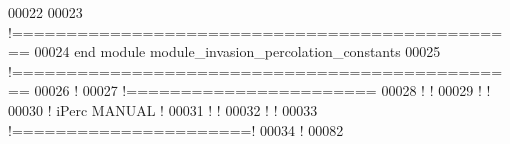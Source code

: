 \begin{DoxyCode}
00022 
00023 \textcolor{comment}{!===============================================}
00024 \textcolor{keyword}{end module module\_invasion\_percolation\_constants}
00025 \textcolor{comment}{!===============================================}
00026 \textcolor{comment}{!}
00027 \textcolor{comment}{!=======================}
00028 \textcolor{comment}{!                      !}
00029 \textcolor{comment}{!                      !}
00030 \textcolor{comment}{!     iPerc MANUAL     !}
00031 \textcolor{comment}{!                      !}
00032 \textcolor{comment}{!                      !}
00033 \textcolor{comment}{!======================!}
00034 \textcolor{comment}{!}
00082 
\end{DoxyCode}
